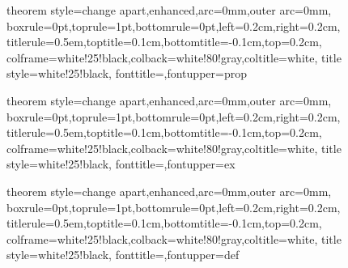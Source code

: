 {theorem style=change apart,enhanced,arc=0mm,outer arc=0mm,
    boxrule=0pt,toprule=1pt,bottomrule=0pt,left=0.2cm,right=0.2cm,
    titlerule=0.5em,toptitle=0.1cm,bottomtitle=-0.1cm,top=0.2cm,
    colframe=white!25!black,colback=white!80!gray,coltitle=white,
    title style={white!25!black},
    fonttitle=\sffamily,fontupper=\normalsize}{prop}

{theorem style=change apart,enhanced,arc=0mm,outer arc=0mm,
    boxrule=0pt,toprule=1pt,bottomrule=0pt,left=0.2cm,right=0.2cm,
    titlerule=0.5em,toptitle=0.1cm,bottomtitle=-0.1cm,top=0.2cm,
    colframe=white!25!black,colback=white!80!gray,coltitle=white,
    title style={white!25!black},
    fonttitle=\sffamily,fontupper=\normalsize}{ex}

{theorem style=change apart,enhanced,arc=0mm,outer arc=0mm,
    boxrule=0pt,toprule=1pt,bottomrule=0pt,left=0.2cm,right=0.2cm,
    titlerule=0.5em,toptitle=0.1cm,bottomtitle=-0.1cm,top=0.2cm,
    colframe=white!25!black,colback=white!80!gray,coltitle=white,
    title style={white!25!black},
    fonttitle=\sffamily,fontupper=\normalsize}{def}

\usepackage{import}
\usepackage{xifthen}
\usepackage{pdfpages}
\usepackage{transparent}

\newcommand{\incfig}[2][1]{%
    \def\svgwidth{#1\columnwidth}
    {#2.pdf_tex}
}

\renewcommand{\implies}{\;\Longrightarrow\;}
\renewcommand{\iff}{\;\Longleftrightarrow\;}

\author{Raúl Estévez Gómez}

